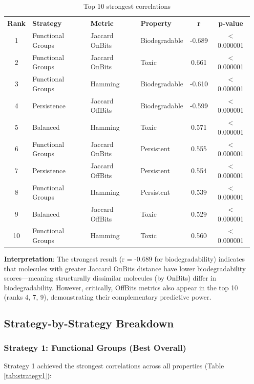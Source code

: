 \documentclass[11pt,letterpaper]{article}
\begin{document}
\begin{table}[H]
\centering
\caption{Top 10 strongest correlations}
\label{tab:top10}
\small
\begin{tabular}{clllcc}
\toprule
\textbf{Rank} & \textbf{Strategy} & \textbf{Metric} & \textbf{Property} & \textbf{r} & \textbf{p-value} \\
\midrule
1 & Functional Groups & Jaccard OnBits & Biodegradable & -0.689 & < 0.000001 \\
2 & Functional Groups & Jaccard OnBits & Toxic & 0.661 & < 0.000001 \\
3 & Functional Groups & Hamming & Biodegradable & -0.610 & < 0.000001 \\
4 & Persistence & Jaccard OffBits & Biodegradable & -0.599 & < 0.000001 \\
5 & Balanced & Hamming & Toxic & 0.571 & < 0.000001 \\
6 & Functional Groups & Jaccard OnBits & Persistent & 0.555 & < 0.000001 \\
7 & Persistence & Jaccard OffBits & Persistent & 0.554 & < 0.000001 \\
8 & Functional Groups & Hamming & Persistent & 0.539 & < 0.000001 \\
9 & Balanced & Jaccard OffBits & Toxic & 0.529 & < 0.000001 \\
10 & Functional Groups & Hamming & Toxic & 0.560 & < 0.000001 \\
\bottomrule
\end{tabular}
\end{table}

\textbf{Interpretation}: The strongest result (r = -0.689 for biodegradability) indicates that molecules with greater Jaccard OnBits distance have lower biodegradability scores—meaning structurally dissimilar molecules (by OnBits) differ in biodegradability. However, critically, OffBits metrics also appear in the top 10 (ranks 4, 7, 9), demonstrating their complementary predictive power.

\subsection{Strategy-by-Strategy Breakdown}

\subsubsection{Strategy 1: Functional Groups (Best Overall)}

Strategy 1 achieved the strongest correlations across all properties (Table \ref{tab:strategy1}):
\end{document}

